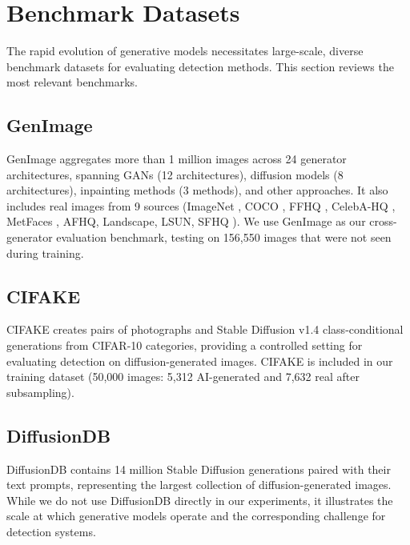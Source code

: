 \documentclass[12pt,a4paper]{book}
\theoremstyle{definition}
\theoremstyle{remark}
\begin{document}
\section{Benchmark Datasets}\label{sec:datasets-related}

The rapid evolution of generative models necessitates large-scale, diverse benchmark datasets for evaluating detection methods. This section reviews the most relevant benchmarks.

\subsection{GenImage}\label{sec:genimage}

GenImage \cite{zhu2024genimage} aggregates more than 1 million images across 24 generator architectures, spanning GANs (12 architectures), diffusion models (8 architectures), inpainting methods (3 methods), and other approaches. It also includes real images from 9 sources (ImageNet \cite{deng2009imagenet}, COCO \cite{lin2014coco}, FFHQ \cite{karras2019ffhq}, CelebA-HQ \cite{karras2018celeba}, MetFaces \cite{karras2020metfaces}, AFHQ, Landscape, LSUN, SFHQ \cite{david2022sfhq}). We use GenImage as our cross-generator evaluation benchmark, testing on 156,550 images that were not seen during training.

\subsection{CIFAKE}\label{sec:cifake}

CIFAKE \cite{bird2024cifake} creates pairs of photographs and Stable Diffusion v1.4 class-conditional generations from CIFAR-10 \cite{krizhevsky2009learning} categories, providing a controlled setting for evaluating detection on diffusion-generated images. CIFAKE is included in our training dataset (50,000 images: 5,312 AI-generated and 7,632 real after subsampling).

\subsection{DiffusionDB}\label{sec:diffusiondb}

DiffusionDB \cite{wang2023diffusiondb} contains 14 million Stable Diffusion generations paired with their text prompts, representing the largest collection of diffusion-generated images. While we do not use DiffusionDB directly in our experiments, it illustrates the scale at which generative models operate and the corresponding challenge for detection systems.
\end{document}
